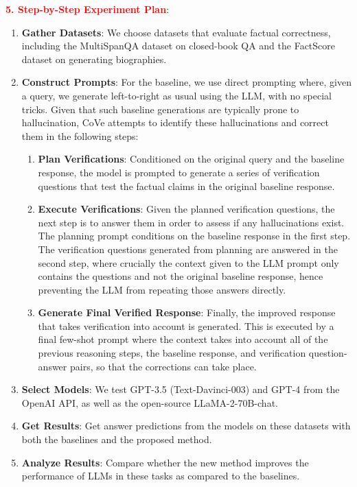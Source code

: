 \textbf{\textcolor{red}{5. Step-by-Step Experiment Plan}}: \\
\begin{enumerate}[label=\textbf{\arabic*:}, topsep=0pt, itemsep=0pt]
    \item \textbf{Gather Datasets}: We choose datasets that evaluate factual correctness, including the MultiSpanQA dataset on closed-book QA and the FactScore dataset on generating biographies.
    \item \textbf{Construct Prompts}: For the baseline, we use direct prompting where, given a query, we generate left-to-right as usual using the LLM, with no special tricks. Given that such baseline generations are typically prone to hallucination, CoVe attempts to identify these hallucinations and correct them in the following steps:
        \begin{enumerate}[label=(\arabic*), leftmargin=3em, topsep=0pt, itemsep=0pt]
            \item \textbf{Plan Verifications}: Conditioned on the original query and the baseline response, the model is prompted to generate a series of verification questions that test the factual claims in the original baseline response.
            \item \textbf{Execute Verifications}: Given the planned verification questions, the next step is to answer them in order to assess if any hallucinations exist. The planning prompt conditions on the baseline response in the first step. The verification questions generated from planning are answered in the second step, where crucially the context given to the LLM prompt only contains the questions and not the original baseline response, hence preventing the LLM from repeating those answers directly.
            \item \textbf{Generate Final Verified Response}: Finally, the improved response that takes verification into account is generated. This is executed by a final few-shot prompt where the context takes into account all of the previous reasoning steps, the baseline response, and verification question-answer pairs, so that the corrections can take place.
        \end{enumerate}
    \item \textbf{Select Models}: We test GPT-3.5 (Text-Davinci-003) and GPT-4 from the OpenAI API, as well as the open-source LLaMA-2-70B-chat.
    \item \textbf{Get Results}: Get answer predictions from the models on these datasets with both the baselines and the proposed method.
    \item \textbf{Analyze Results}: Compare whether the new method improves the performance of LLMs in these tasks as compared to the baselines.
\end{enumerate}




